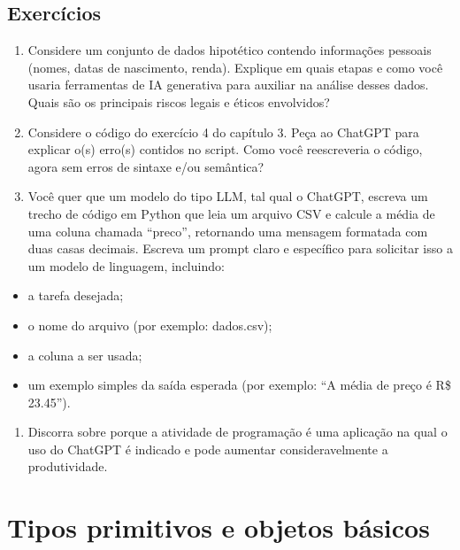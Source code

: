 \documentclass[
  brazilian,
  letterpaper,
  DIV=11,
  numbers=noendperiod]{scrreprt}
\providecommand{\tightlist}{%
  \setlength{\itemsep}{0pt}\setlength{\parskip}{0pt}}
\begin{document}
\section{Exercícios}\label{exercuxedcios-2}

\begin{enumerate}
\def\labelenumi{\arabic{enumi}.}
\item
  Considere um conjunto de dados hipotético contendo informações
  pessoais (nomes, datas de nascimento, renda). Explique em quais etapas
  e como você usaria ferramentas de IA generativa para auxiliar na
  análise desses dados. Quais são os principais riscos legais e éticos
  envolvidos?
\item
  Considere o código do exercício 4 do capítulo 3. Peça ao ChatGPT para
  explicar o(s) erro(s) contidos no script. Como você reescreveria o
  código, agora sem erros de sintaxe e/ou semântica?
\item
  Você quer que um modelo do tipo LLM, tal qual o ChatGPT, escreva um
  trecho de código em Python que leia um arquivo CSV e calcule a média
  de uma coluna chamada ``preco'', retornando uma mensagem formatada com
  duas casas decimais. Escreva um prompt claro e específico para
  solicitar isso a um modelo de linguagem, incluindo:
\end{enumerate}

\begin{itemize}
\tightlist
\item
  a tarefa desejada;
\item
  o nome do arquivo (por exemplo: dados.csv);
\item
  a coluna a ser usada;
\item
  um exemplo simples da saída esperada (por exemplo: ``A média de preço
  é R\$ 23.45'').
\end{itemize}

\begin{enumerate}
\def\labelenumi{\arabic{enumi}.}
\setcounter{enumi}{2}
\tightlist
\item
  Discorra sobre porque a atividade de programação é uma aplicação na
  qual o uso do ChatGPT é indicado e pode aumentar consideravelmente a
  produtividade.
\end{enumerate}

\chapter{Tipos primitivos e objetos básicos}\label{sec-objetos}
\end{document}
